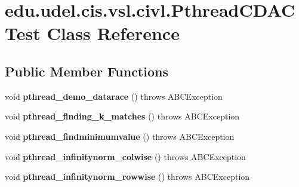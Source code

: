 \hypertarget{classedu_1_1udel_1_1cis_1_1vsl_1_1civl_1_1PthreadCDACTest}{}\section{edu.\+udel.\+cis.\+vsl.\+civl.\+Pthread\+C\+D\+A\+C\+Test Class Reference}
\label{classedu_1_1udel_1_1cis_1_1vsl_1_1civl_1_1PthreadCDACTest}
\subsection*{Public Member Functions}
\begin{DoxyCompactItemize}
\item 
\hypertarget{classedu_1_1udel_1_1cis_1_1vsl_1_1civl_1_1PthreadCDACTest_a443ab19070a619ce1bdab10f76c9c095}{}void {\bfseries pthread\+\_\+demo\+\_\+datarace} ()  throws A\+B\+C\+Exception \label{classedu_1_1udel_1_1cis_1_1vsl_1_1civl_1_1PthreadCDACTest_a443ab19070a619ce1bdab10f76c9c095}

\item 
\hypertarget{classedu_1_1udel_1_1cis_1_1vsl_1_1civl_1_1PthreadCDACTest_a92c61182429c266ea3595870a4646718}{}void {\bfseries pthread\+\_\+finding\+\_\+k\+\_\+matches} ()  throws A\+B\+C\+Exception \label{classedu_1_1udel_1_1cis_1_1vsl_1_1civl_1_1PthreadCDACTest_a92c61182429c266ea3595870a4646718}

\item 
\hypertarget{classedu_1_1udel_1_1cis_1_1vsl_1_1civl_1_1PthreadCDACTest_aaf5fe130a8aa0a8b25a66b9d90d0a748}{}void {\bfseries pthread\+\_\+findminimumvalue} ()  throws A\+B\+C\+Exception \label{classedu_1_1udel_1_1cis_1_1vsl_1_1civl_1_1PthreadCDACTest_aaf5fe130a8aa0a8b25a66b9d90d0a748}

\item 
\hypertarget{classedu_1_1udel_1_1cis_1_1vsl_1_1civl_1_1PthreadCDACTest_a02bda1d11e8c758e68c23a9386802b25}{}void {\bfseries pthread\+\_\+infinitynorm\+\_\+colwise} ()  throws A\+B\+C\+Exception \label{classedu_1_1udel_1_1cis_1_1vsl_1_1civl_1_1PthreadCDACTest_a02bda1d11e8c758e68c23a9386802b25}

\item 
\hypertarget{classedu_1_1udel_1_1cis_1_1vsl_1_1civl_1_1PthreadCDACTest_a42c4f3c593f194dcb070da3102b45017}{}void {\bfseries pthread\+\_\+infinitynorm\+\_\+rowwise} ()  throws A\+B\+C\+Exception \label{classedu_1_1udel_1_1cis_1_1vsl_1_1civl_1_1PthreadCDACTest_a42c4f3c593f194dcb070da3102b45017}


\end{DoxyCompactItemize}
